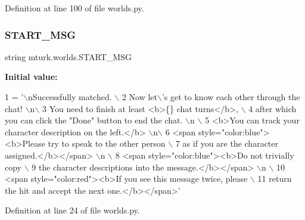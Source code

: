 Definition at line 100 of file worlds.\+py.

\mbox{\label{namespacemturk_1_1worlds_a94bf5082f959a76c294945bb387305d3}} 
\subsubsection{\texorpdfstring{S\+T\+A\+R\+T\+\_\+\+M\+SG}{START\_MSG}}
{\footnotesize\ttfamily string mturk.\+worlds.\+S\+T\+A\+R\+T\+\_\+\+M\+SG}

{\bfseries Initial value\+:}
\begin{DoxyCode}
1 =  \textcolor{stringliteral}{'\(\backslash\)nSuccessfully matched. \(\backslash\)}
2 \textcolor{stringliteral}{        Now let\(\backslash\)'s get to know each other through the chat! \(\backslash\)n\(\backslash\)}
3 \textcolor{stringliteral}{        You need to finish at least <b>\{\} chat turns</b>, \(\backslash\)}
4 \textcolor{stringliteral}{        after which you can click the "Done" button to end the chat. \(\backslash\)n \(\backslash\)}
5 \textcolor{stringliteral}{        <b>You can track your character description on the left.</b> \(\backslash\)n\(\backslash\)}
6 \textcolor{stringliteral}{        <span style="color:blue"><b>Please try to speak to the other person \(\backslash\)}
7 \textcolor{stringliteral}{        as if you are the character assigned.</b></span> \(\backslash\)n \(\backslash\)}
8 \textcolor{stringliteral}{        <span style="color:blue"><b>Do not trivially copy \(\backslash\)}
9 \textcolor{stringliteral}{        the character descriptions into the message.</b></span> \(\backslash\)n \(\backslash\)}
10 \textcolor{stringliteral}{        <span style="color:red"><b>If you see this message twice, please \(\backslash\)}
11 \textcolor{stringliteral}{        return the hit and accept the next one.</b></span>'}
\end{DoxyCode}


Definition at line 24 of file worlds.\+py.

\mbox{\label{namespacemturk_1_1worlds_a5c73054a085bb461debad57233769934}} 
